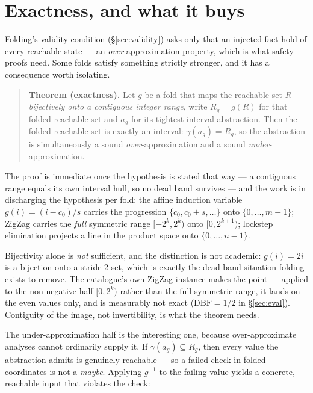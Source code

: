 \documentclass[11pt,a4paper]{article}
\begin{document}
\section{Exactness, and what it buys}
\label{sec:exactness}

Folding's validity condition (\S\ref{sec:validity}) asks only that an injected fact hold
of every reachable state --- an \emph{over}-approximation property, which is what safety
proofs need. Some folds satisfy something strictly stronger, and it has a consequence
worth isolating.

\begin{quote}
\textbf{Theorem (exactness).} Let $g$ be a fold that maps the reachable set $R$
\emph{bijectively onto a contiguous integer range}, write $R_g = g(R)$ for that folded
reachable set and $a_g$ for its tightest interval abstraction. Then the folded reachable
set is exactly an interval: $\gamma(a_g) = R_g$, so the abstraction is simultaneously a sound
\emph{over}-approximation and a sound \emph{under}-approximation.
\end{quote}

\noindent
The proof is immediate once the hypothesis is stated that way --- a contiguous range
equals its own interval hull, so no dead band survives --- and the work is in discharging
the hypothesis per fold: the affine induction variable $g(i) = (i-c_0)/s$ carries the
progression $\{c_0, c_0+s, \dots\}$ onto $\{0,\dots,m-1\}$; ZigZag carries the
\emph{full} symmetric range $[-2^k, 2^k)$ onto $[0, 2^{k+1})$; lockstep elimination
projects a line in the product space onto $\{0,\dots,n-1\}$.

Bijectivity alone is \emph{not} sufficient, and the distinction is not academic:
$g(i) = 2i$ is a bijection onto a stride-2 set, which is exactly the dead-band situation
folding exists to remove. The catalogue's own ZigZag instance makes the point --- applied
to the non-negative half $[0, 2^k)$ rather than the full symmetric range, it lands on the
even values only, and is measurably not exact ($\mathrm{DBF} = 1/2$ in
\S\ref{sec:eval}). Contiguity of the image, not invertibility, is what the theorem
needs.

The under-approximation half is the interesting one, because over-approximate analyses
cannot ordinarily supply it. If $\gamma(a_g) \subseteq R_g$, then every value the
abstraction admits is genuinely reachable --- so a failed check in folded coordinates is
not a \emph{maybe}. Applying $g^{-1}$ to the failing value yields a concrete, reachable
input that violates the check:
\end{document}
